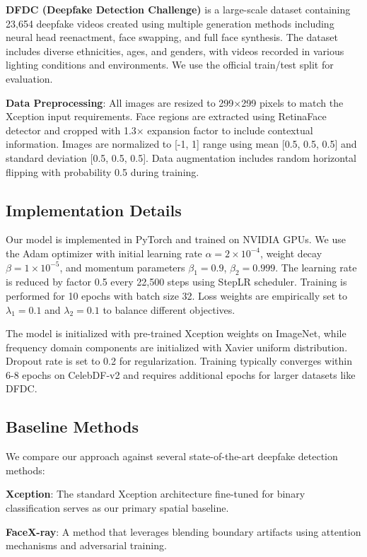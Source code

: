 \documentclass[letterpaper]{article} %
\begin{document}
\textbf{DFDC (Deepfake Detection Challenge)} is a large-scale dataset containing 23,654 deepfake videos created using multiple generation methods including neural head reenactment, face swapping, and full face synthesis. The dataset includes diverse ethnicities, ages, and genders, with videos recorded in various lighting conditions and environments. We use the official train/test split for evaluation.

\textbf{Data Preprocessing}: All images are resized to 299×299 pixels to match the Xception input requirements. Face regions are extracted using RetinaFace detector and cropped with 1.3× expansion factor to include contextual information. Images are normalized to [-1, 1] range using mean [0.5, 0.5, 0.5] and standard deviation [0.5, 0.5, 0.5]. Data augmentation includes random horizontal flipping with probability 0.5 during training.

\subsection{Implementation Details}

Our model is implemented in PyTorch and trained on NVIDIA GPUs. We use the Adam optimizer with initial learning rate $\alpha = 2 \times 10^{-4}$, weight decay $\beta = 1 \times 10^{-5}$, and momentum parameters $\beta_1 = 0.9$, $\beta_2 = 0.999$. The learning rate is reduced by factor 0.5 every 22,500 steps using StepLR scheduler. Training is performed for 10 epochs with batch size 32. Loss weights are empirically set to $\lambda_1 = 0.1$ and $\lambda_2 = 0.1$ to balance different objectives.

The model is initialized with pre-trained Xception weights on ImageNet, while frequency domain components are initialized with Xavier uniform distribution. Dropout rate is set to 0.2 for regularization. Training typically converges within 6-8 epochs on CelebDF-v2 and requires additional epochs for larger datasets like DFDC.

\subsection{Baseline Methods}

We compare our approach against several state-of-the-art deepfake detection methods:

\textbf{Xception}: The standard Xception architecture fine-tuned for binary classification serves as our primary spatial baseline.

\textbf{FaceX-ray}: A method that leverages blending boundary artifacts using attention mechanisms and adversarial training.
\end{document}
